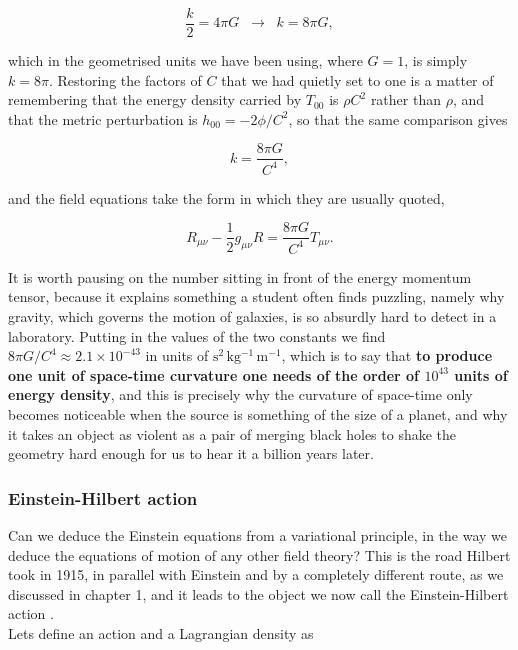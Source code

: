 \begin{equation}
    \frac{k}{2} = 4\pi G \;\;\longrightarrow\;\; k = 8\pi G,
\end{equation}

which in the geometrised units we have been using, where $G=1$, is simply $k = 8\pi$. Restoring the factors of $C$ that we had quietly set to one is a matter of remembering that the energy density carried by $T_{00}$ is $\rho C^2$ rather than $\rho$, and that the metric perturbation is $h_{00}=-2\phi/C^2$, so that the same comparison gives

\begin{equation}\label{eq:kValue}
    k = \frac{8\pi G}{C^4},
\end{equation}

and the field equations take the form in which they are usually quoted,

\begin{equation}\label{eq:EFEfull}
    R_{\mu\nu} - \frac{1}{2}g_{\mu\nu}R = \frac{8\pi G}{C^4}T_{\mu\nu}.
\end{equation}

It is worth pausing on the number sitting in front of the energy momentum tensor, because it explains something a student often finds puzzling, namely why gravity, which governs the motion of galaxies, is so absurdly hard to detect in a laboratory. Putting in the values of the two constants we find $8\pi G/C^4 \approx 2.1\times 10^{-43}$ in units of $\mathrm{s^2\,kg^{-1}\,m^{-1}}$, which is to say that \textbf{to produce one unit of space-time curvature one needs of the order of $10^{43}$ units of energy density}, and this is precisely why the curvature of space-time only becomes noticeable when the source is something of the size of a planet, and why it takes an object as violent as a pair of merging black holes to shake the geometry hard enough for us to hear it a billion years later.

        \subsubsection{Einstein-Hilbert action}

        Can we deduce the Einstein equations from a variational principle, in the way we deduce the equations of motion of any other field theory? This is the road Hilbert took in 1915, in parallel with Einstein and by a completely different route, as we discussed in chapter 1, and it leads to the object we now call the Einstein-Hilbert action \citep{hilbert1915}.\\
        Lets define an action and a Lagrangian density as

